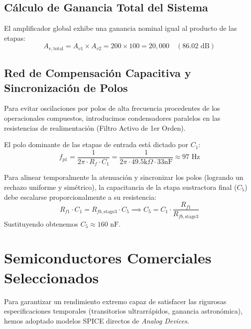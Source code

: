 \documentclass[11pt, a4paper]{article}
\begin{document}
\subsection{Cálculo de Ganancia Total del Sistema}

El amplificador global exhibe una ganancia nominal igual al producto de las etapas:
\begin{equation}
A_{v,\text{total}} = A_{v1} \times A_{v2} = 200 \times 100 = 20,000 \quad (86.02\text{ dB})
\end{equation}

\subsection{Red de Compensación Capacitiva y Sincronización de Polos}

Para evitar oscilaciones por polos de alta frecuencia procedentes de los operacionales compuestos, introducimos condensadores paralelos en las resistencias de realimentación (Filtro Activo de 1er Orden).

El polo dominante de las etapas de entrada está dictado por $C_1$:
\begin{equation}
f_{p1} = \frac{1}{2\pi \cdot R_f \cdot C_1} = \frac{1}{2\pi \cdot 49.5\text{k}\Omega \cdot 33\text{nF}} \approx 97\text{ Hz}
\end{equation}

Para alinear temporalmente la atenuación y sincronizar los polos (logrando un rechazo uniforme y simétrico), la capacitancia de la etapa sustractora final ($C_5$) debe escalarse proporcionalmente a su resistencia:
\begin{equation}
R_{f1} \cdot C_1 = R_{fb, \text{stage3}} \cdot C_5 \implies C_5 = C_1 \cdot \frac{R_{f1}}{R_{fb, \text{stage3}}}
\end{equation}
Sustituyendo obtenemos $C_5 \approx 160\text{ nF}$.

\newpage
\section{Semiconductores Comerciales Seleccionados}

Para garantizar un rendimiento extremo capaz de satisfacer las rigurosas especificaciones temporales (transitorios ultrarrápidos, ganancia astronómica), hemos adoptado modelos SPICE directos de \textit{Analog Devices}.
\end{document}

